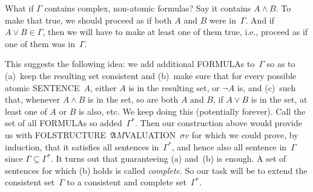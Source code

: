 \documentclass[10pt,a4paper]{article}
\newcommand*{\olup}[1]{\MakeUppercase{#1}}
\theoremstyle{plain}
\theoremstyle{definition}
\theoremstyle{remark}
\providecommand{\Struct}{\ensuremath{\mathfrak{A}}}
\providecommand{\iftag}[1]{#1}
\providecommand{\pAssign}{\sigma}
\providecommand{\iftag}{}
\begin{document}
What if $\Gamma$ contains complex, non-atomic formulas? Say it
contains $A \land B$. To make that true, we should proceed as if
both $A$ and $B$ were in~$\Gamma$.  And if $A \lor B \in \Gamma$,
then we will have to make at least one of them true, i.e., proceed as
if one of them was in~$\Gamma$.

This suggests the following idea: we add additional \olup{formula}s
to~$\Gamma$ so as to (a)~keep the resulting set consistent and
(b)~make sure that for every possible atomic \olup{sentence}~$A$, either
$A$ is in the resulting set, or $\lnot A$ is, and (c)~such that,
whenever $A \land B$ is in the set, so are both $A$ and $B$, if
$A \lor B$ is in the set, at least one of $A$ or $B$ is also, etc.
We keep doing this (potentially forever).  Call the set of all
\olup{formula}s so added~$\Gamma^*$.  Then our construction above would
provide us with \iftag{FOL}{\olup{structure}~$\Struct{M}$}{\olup{valuation}~$\pAssign{v}$}
for which we could prove, by induction, that it satisfies all sentences
in~$\Gamma^*$, and hence also all sentence in~$\Gamma$
since $\Gamma \subseteq \Gamma^*$.  It turns out that guaranteeing (a)
and~(b) is enough. A set of sentences for which (b) holds is called
\emph{complete}. So our task will be to extend the consistent
set~$\Gamma$ to a consistent and complete set~$\Gamma^*$.
\end{document}

